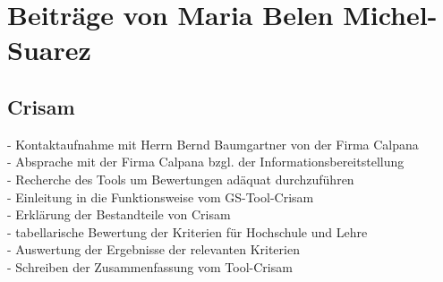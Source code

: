 \documentclass{article}
\begin{document}
\section{Beiträge von Maria Belen Michel-Suarez}
\subsection{Crisam}

- Kontaktaufnahme mit Herrn Bernd Baumgartner von der Firma Calpana
\\
- Absprache mit der Firma Calpana bzgl. der Informationsbereitstellung
\\
- Recherche des Tools um Bewertungen adäquat durchzuführen
\\
- Einleitung in die Funktionsweise vom GS-Tool-Crisam
\\
- Erklärung der Bestandteile von Crisam
\\
- tabellarische Bewertung der Kriterien für Hochschule und Lehre
\\
- Auswertung der Ergebnisse der relevanten Kriterien
\\
- Schreiben der Zusammenfassung vom Tool-Crisam
\end{document}
